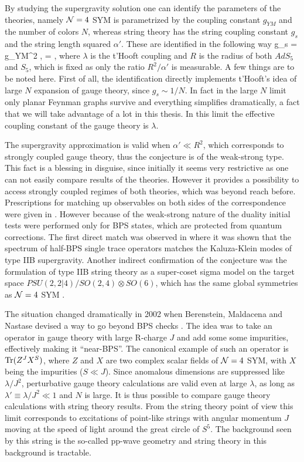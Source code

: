 By studying the supergravity solution one can identify the parameters of the theories, namely $\mathcal{N}=4$ SYM is parametrized by the coupling constant $g_{YM}$ and the number of colors $N$, whereas string theory has the string coupling constant $g_s$ and the string length squared $\alpha'$. 
These are identified in the following way
\pi g_s = g_{YM}^2 \equiv {}, \;\;\;\;\;\;\;  = \lambda,
\eeq
where $\lambda$ is the t'Hooft coupling and $R$ is the radius of both $AdS_5$ and $S_5$, which is fixed as only the ratio $R^2/\alpha'$ is measurable.
A few things are to be noted here. First of all, the identification directly implements t'Hooft's idea of large $N$ expansion of gauge theory, since $g_s \sim 1/N$. 
In fact in the large $N$ limit only planar Feynman graphs survive and everything simplifies dramatically, a fact that we will take advantage of a lot in this thesis.
In this limit the effective coupling constant of the gauge theory is $\lambda$. 

The supergravity approximation is valid when $\alpha' \ll R^2$, which corresponds to strongly coupled gauge theory, thus the conjecture is of the weak-strong type. 
This fact is a blessing in disguise, since initially it seems very restrictive as one can not easily compare results of the theories. 
However it provides a possibility to access strongly coupled regimes of both theories, which was beyond reach before. 
Prescriptions for matching up observables on both sides of the correspondence were given in \cite{Gubser:1998bc, Witten:1998qj}. 
However because of the weak-strong nature of the duality initial tests were performed only for BPS states, which are protected from quantum corrections.
The first direct match was observed in \cite{Witten:1998qj} where it was shown that the spectrum of half-BPS single trace operators matches the Kaluza-Klein modes of type IIB supergravity.
Another indirect confirmation of the conjecture was the formulation of type IIB string theory as a super-coset sigma model on the target space $PSU(2,2|4) / SO(2,4) \otimes SO(6)$, which has the same global symmetries as $\mathcal{N}=4$ SYM \cite{Metsaev:1998it}.

The situation changed dramatically in 2002 when Berenstein, Maldacena and Nastase devised a way to go beyond BPS checks \cite{Berenstein:2002jq}. 
The idea was to take an operator in gauge theory with large R-charge $J$ and add some some impurities, effectively making it ``near-BPS''.
The canonical example of such an operator is $\mathrm{Tr}(Z^J X^S)$, where $Z$ and $X$ are two complex scalar fields of $\mathcal{N}=4$ SYM, with $X$ being the impurities ($S \ll J$).
Since anomalous dimensions are suppressed like $\lambda/J^2$, perturbative gauge theory calculations are valid even at large $\lambda$, as long as $\lambda' \equiv \lambda / J^2 \ll 1$ and $N$ is large.
It is thus possible to compare gauge theory calculations with string theory results.
From the string theory point of view this limit corresponds to excitations of point-like strings with angular momentum $J$ moving at the speed of light around the great circle of $S^5$. 
The background seen by this string is the so-called pp-wave geometry and string theory in this background is tractable.

